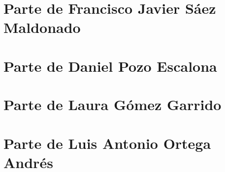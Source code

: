 \documentclass[11pt]{article}
\begin{document}
\section{Parte de Francisco Javier Sáez Maldonado}

 \newpage

\section{Parte de Daniel Pozo Escalona}
 \newpage

\section{Parte de Laura Gómez Garrido} 

 \newpage

\section{Parte de Luis Antonio Ortega Andrés}

 
 
 
 
 
 
\end{document}
